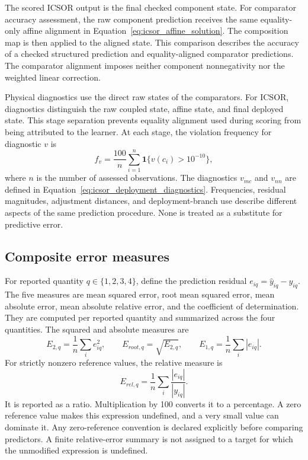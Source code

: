 The scored ICSOR output is the final checked component state. For comparator accuracy assessment, the raw component prediction receives the same equality-only affine alignment in Equation~\eqref{eq:icsor_affine_solution}. The composition map is then applied to the aligned state. This comparison describes the accuracy of a checked structured prediction and equality-aligned comparator predictions. The comparator alignment imposes neither component nonnegativity nor the weighted linear correction.

Physical diagnostics use the direct raw states of the comparators. For ICSOR, diagnostics distinguish the raw coupled state, affine state, and final deployed state. This stage separation prevents equality alignment used during scoring from being attributed to the learner. At each stage, the violation frequency for diagnostic \(v\) is
\begin{equation}
\label{eq:icsor_violation_frequency}
f_v=\frac{100}{n}\sum_{i=1}^{n}
\mathbf{1}\{v(c_i)>10^{-10}\},
\end{equation}
where \(n\) is the number of assessed observations. The diagnostics \(v_{mc}\) and \(v_{nn}\) are defined in Equation~\eqref{eq:icsor_deployment_diagnostics}. Frequencies, residual magnitudes, adjustment distances, and deployment-branch use describe different aspects of the same prediction procedure. None is treated as a substitute for predictive error.

\subsection{Composite error measures}

For reported quantity \(q\in\{1,2,3,4\}\), define the prediction residual \(e_{iq}=\widehat y_{iq}-y_{iq}\). The five measures are mean squared error, root mean squared error, mean absolute error, mean absolute relative error, and the coefficient of determination. They are computed per reported quantity and summarized across the four quantities. The squared and absolute measures are
\begin{equation}
\label{eq:icsor_composite_error_metrics}
E_{2,q}=\frac{1}{n}\sum_i e_{iq}^{2},
\qquad E_{root,q}=\sqrt{E_{2,q}},
\qquad E_{1,q}=\frac{1}{n}\sum_i|e_{iq}|.
\end{equation}
For strictly nonzero reference values, the relative measure is
\begin{equation}
\label{eq:icsor_relative_error}
E_{rel,q}=\frac{1}{n}\sum_i\frac{|e_{iq}|}{|y_{iq}|}.
\end{equation}
It is reported as a ratio. Multiplication by 100 converts it to a percentage. A zero reference value makes this expression undefined, and a very small value can dominate it. Any zero-reference convention is declared explicitly before comparing predictors. A finite relative-error summary is not assigned to a target for which the unmodified expression is undefined.

